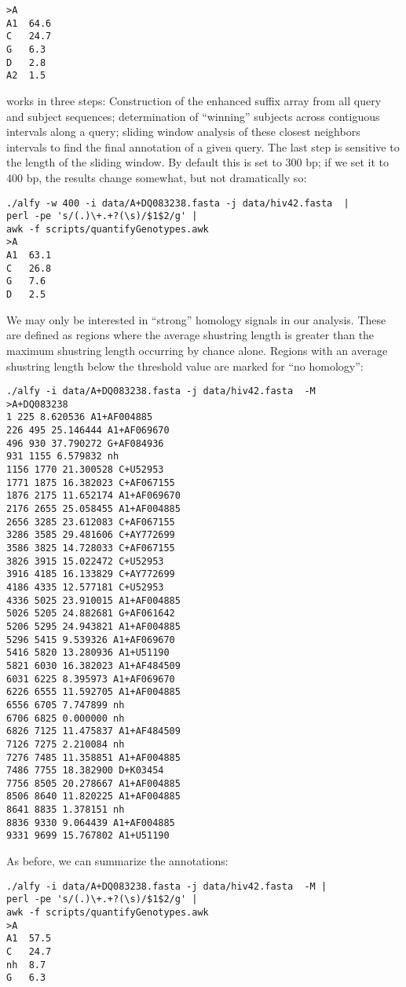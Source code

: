 \documentclass{article}
\begin{document}
\begin{itemize}
\begin{verbatim}
>A
A1	64.6
C	24.7
G	6.3
D	2.8
A2	1.5
\end{verbatim}
\I {} works in three steps:
\be
\I Construction of the enhanced suffix array from all query and
subject sequences;
\I determination of ``winning'' subjects across contiguous intervals
along a query;
\I sliding window analysis of these closest neighbors intervals to
find the final annotation of a given query.
\ee
The last step is sensitive to the length of the sliding window. By
default this is set to 300 bp; if we set it to 400 bp, the results
change somewhat, but not dramatically so:
\begin{verbatim}
./alfy -w 400 -i data/A+DQ083238.fasta -j data/hiv42.fasta  | 
perl -pe 's/(.)\+.+?(\s)/$1$2/g' | 
awk -f scripts/quantifyGenotypes.awk
>A
A1	63.1
C	26.8
G	7.6
D	2.5
\end{verbatim}
\I We may only be interested in ``strong'' homology signals in our
analysis. These are defined as regions where the average shustring
length is greater than the maximum shustring length occurring by chance
alone. Regions with an average shustring length below the threshold value are
marked   for ``no homology'':
\begin{verbatim}
./alfy -i data/A+DQ083238.fasta -j data/hiv42.fasta  -M
>A+DQ083238
1 225 8.620536 A1+AF004885
226 495 25.146444 A1+AF069670
496 930 37.790272 G+AF084936
931 1155 6.579832 nh
1156 1770 21.300528 C+U52953
1771 1875 16.382023 C+AF067155
1876 2175 11.652174 A1+AF069670
2176 2655 25.058455 A1+AF004885
2656 3285 23.612083 C+AF067155
3286 3585 29.481606 C+AY772699
3586 3825 14.728033 C+AF067155
3826 3915 15.022472 C+U52953
3916 4185 16.133829 C+AY772699
4186 4335 12.577181 C+U52953
4336 5025 23.910015 A1+AF004885
5026 5205 24.882681 G+AF061642
5206 5295 24.943821 A1+AF004885
5296 5415 9.539326 A1+AF069670
5416 5820 13.280936 A1+U51190
5821 6030 16.382023 A1+AF484509
6031 6225 8.395973 A1+AF069670
6226 6555 11.592705 A1+AF004885
6556 6705 7.747899 nh
6706 6825 0.000000 nh
6826 7125 11.475837 A1+AF484509
7126 7275 2.210084 nh
7276 7485 11.358851 A1+AF004885
7486 7755 18.382900 D+K03454
7756 8505 20.278667 A1+AF004885
8506 8640 11.820225 A1+AF004885
8641 8835 1.378151 nh
8836 9330 9.064439 A1+AF004885
9331 9699 15.767802 A1+U51190
\end{verbatim}
\I As before, we can summarize the annotations:
\begin{verbatim}
./alfy -i data/A+DQ083238.fasta -j data/hiv42.fasta  -M |
perl -pe 's/(.)\+.+?(\s)/$1$2/g' | 
awk -f scripts/quantifyGenotypes.awk
>A
A1	57.5
C	24.7
nh	8.7
G	6.3

\end{verbatim}
\end{itemize}
\end{document}
